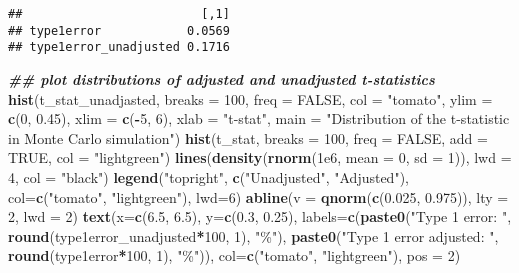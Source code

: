 \documentclass[
]{book}
\newenvironment{Shaded}{\begin{snugshade}}{\end{snugshade}}
\newcommand{\AttributeTok}[1]{\textcolor[rgb]{0.13,0.29,0.53}{#1}}
\newcommand{\ConstantTok}[1]{\textcolor[rgb]{0.56,0.35,0.01}{#1}}
\newcommand{\DecValTok}[1]{\textcolor[rgb]{0.00,0.00,0.81}{#1}}
\newcommand{\DocumentationTok}[1]{\textcolor[rgb]{0.56,0.35,0.01}{\textbf{\textit{#1}}}}
\newcommand{\FloatTok}[1]{\textcolor[rgb]{0.00,0.00,0.81}{#1}}
\newcommand{\FunctionTok}[1]{\textcolor[rgb]{0.13,0.29,0.53}{\textbf{#1}}}
\newcommand{\NormalTok}[1]{#1}
\newcommand{\SpecialCharTok}[1]{\textcolor[rgb]{0.81,0.36,0.00}{\textbf{#1}}}
\newcommand{\StringTok}[1]{\textcolor[rgb]{0.31,0.60,0.02}{#1}}
\begin{document}
\begin{verbatim}
##                         [,1]
## type1error            0.0569
## type1error_unadjusted 0.1716
\end{verbatim}

\begin{Shaded}
\begin{Highlighting}[]
\DocumentationTok{\#\# plot distributions of adjusted and unadjusted t{-}statistics}
\FunctionTok{hist}\NormalTok{(t\_stat\_unadjasted, }\AttributeTok{breaks =} \DecValTok{100}\NormalTok{, }\AttributeTok{freq =} \ConstantTok{FALSE}\NormalTok{, }\AttributeTok{col =} \StringTok{"tomato"}\NormalTok{, }
     \AttributeTok{ylim =} \FunctionTok{c}\NormalTok{(}\DecValTok{0}\NormalTok{, }\FloatTok{0.45}\NormalTok{), }\AttributeTok{xlim =} \FunctionTok{c}\NormalTok{(}\SpecialCharTok{{-}}\DecValTok{5}\NormalTok{, }\DecValTok{6}\NormalTok{), }\AttributeTok{xlab =} \StringTok{"t{-}stat"}\NormalTok{, }
     \AttributeTok{main =} \StringTok{"Distribution of the t{-}statistic in Monte Carlo simulation"}\NormalTok{)}
\FunctionTok{hist}\NormalTok{(t\_stat, }\AttributeTok{breaks =} \DecValTok{100}\NormalTok{, }\AttributeTok{freq =} \ConstantTok{FALSE}\NormalTok{, }\AttributeTok{add =} \ConstantTok{TRUE}\NormalTok{, }\AttributeTok{col =} \StringTok{"lightgreen"}\NormalTok{)}
\FunctionTok{lines}\NormalTok{(}\FunctionTok{density}\NormalTok{(}\FunctionTok{rnorm}\NormalTok{(}\FloatTok{1e6}\NormalTok{, }\AttributeTok{mean =} \DecValTok{0}\NormalTok{, }\AttributeTok{sd =} \DecValTok{1}\NormalTok{)), }\AttributeTok{lwd =} \DecValTok{4}\NormalTok{, }\AttributeTok{col =} \StringTok{"black"}\NormalTok{)}
\FunctionTok{legend}\NormalTok{(}\StringTok{"topright"}\NormalTok{, }\FunctionTok{c}\NormalTok{(}\StringTok{"Unadjusted"}\NormalTok{, }\StringTok{"Adjusted"}\NormalTok{), }\AttributeTok{col=}\FunctionTok{c}\NormalTok{(}\StringTok{"tomato"}\NormalTok{, }\StringTok{"lightgreen"}\NormalTok{), }\AttributeTok{lwd=}\DecValTok{6}\NormalTok{)}
\FunctionTok{abline}\NormalTok{(}\AttributeTok{v =} \FunctionTok{qnorm}\NormalTok{(}\FunctionTok{c}\NormalTok{(}\FloatTok{0.025}\NormalTok{, }\FloatTok{0.975}\NormalTok{)), }\AttributeTok{lty =} \DecValTok{2}\NormalTok{, }\AttributeTok{lwd =} \DecValTok{2}\NormalTok{)}
\FunctionTok{text}\NormalTok{(}\AttributeTok{x=}\FunctionTok{c}\NormalTok{(}\FloatTok{6.5}\NormalTok{, }\FloatTok{6.5}\NormalTok{), }\AttributeTok{y=}\FunctionTok{c}\NormalTok{(}\FloatTok{0.3}\NormalTok{, }\FloatTok{0.25}\NormalTok{), }
     \AttributeTok{labels=}\FunctionTok{c}\NormalTok{(}\FunctionTok{paste0}\NormalTok{(}\StringTok{"Type 1 error: "}\NormalTok{, }\FunctionTok{round}\NormalTok{(type1error\_unadjusted}\SpecialCharTok{*}\DecValTok{100}\NormalTok{, }\DecValTok{1}\NormalTok{), }\StringTok{"\%"}\NormalTok{),}
              \FunctionTok{paste0}\NormalTok{(}\StringTok{"Type 1 error adjusted: "}\NormalTok{, }\FunctionTok{round}\NormalTok{(type1error}\SpecialCharTok{*}\DecValTok{100}\NormalTok{, }\DecValTok{1}\NormalTok{), }\StringTok{"\%"}\NormalTok{)), }
     \AttributeTok{col=}\FunctionTok{c}\NormalTok{(}\StringTok{"tomato"}\NormalTok{, }\StringTok{"lightgreen"}\NormalTok{), }\AttributeTok{pos =} \DecValTok{2}\NormalTok{)}
\end{Highlighting}
\end{Shaded}
\end{document}
